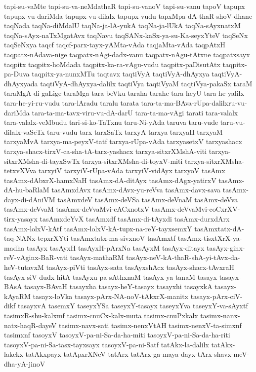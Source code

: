 {tapi-su-vaMte
tapi-su-va-neMdathaR
tapi-su-vanoV
tapi-su-vanu
tapoV
tapupx
tapupx-vu-dariMda
tapupx-vu-dilalx
tapupx-vudu
tapxMpa-dA-thaR-shoV-dhane
taqNada
taqNa-diMdalU
taqNa-ja-lA-yukA
taqNa-ja-lUkA
taqNa-sAyxnatxM
taqNa-sAyx-naTxMgatAvx
taqNavu
taqSANx-kaSx-ya-su-Ka-seyxYteV
taqSeNx
taqSeNxya
taqcf
taqcf-parx-tayx-yAMta-vAda
taqjaMta-vAda
taqpAtxH
taqpatx-nAdava-nige
taqpatx-nAgi-dadx-vanu
taqpatx-nAgu-tAtxne
taqpatxsayx
taqpitx
taqpitx-hoMdada
taqpitx-ka-ra-vAgu-vudu
taqpitx-paDisutAtx
taqpitx-pa-Duva
taqpitx-ya-nunxMTu
taqtavx
taqtiVyA
taqtiVyA-dhAyxya
taqtiVyA-dhAyxyada
taqtiVyA-dhAyxya-dalilx
taqtiVya
taqtiVyaM
taqtiVya-pakaSx
taraM
taraMgA-di-gaLige
taraMga
tara-beVku
taraha
tarahe
tara-heyU
tara-he-yalilx
tara-he-yi-ru-vudu
tara-lAradu
taralu
tarata
tara-ta-ma-BAva-rUpa-dalilxru-vu-dariMda
tara-ta-ma-tavx-viru-vu-dA-darU
tara-ta-ma-vAgi
tarati
tara-valalx
tara-valalx-veMbudu
tari-si-ko-TaTxnu
taru-Ni-yAda
taruva
taru-vude
taru-vu-dilalx-vaSeTx
taru-vudu
tarx
tarxSaTx
tarxyA
tarxya
tarxyaH
tarxyaM
tarxyaMvA
tarxya-ma-peyxV-tatf
tarxya-rUpa-vAda
tarxyasetxV
tarxyashacx
tarxya-shacx-tirxV-ca-sha-tA-tarx-yashacx
tarxya-sitxrXMshA-viti
tarxya-sitxrXMsha-di-tayxSwTx
tarxya-sitxrXMsha-di-toyxV-miti
tarxya-sitxrXMsha-tetxvXVva
tarxyiV
tarxyiV-rUpa-vAda
tarxyiV-vidAyx
tarxyoV
tasAmx
tasAmx-dAbxrX-hamxNaH
tasAmx-dA-ditAyx
tasAmx-dAgx-yatirxV
tasAmx-dA-hu-baRlaM
tasAmxdAvx
tasAmx-dAvx-yu-reVva
tasAmx-davx-sava
tasAmx-dayx-di-dAniVM
tasAmxdeV
tasAmx-deVSa
tasAmx-deVnaM
tasAmx-deVva
tasAmx-deVvaM
tasAmx-deVvaMvi-cACxnotxV
tasAmx-deVvaMvi-coCxrXV-tirx-yasayx
tasAmxdeYvX
tasAmxdf
tasAmx-di-tAyxdi
tasAmx-durxdArx
tasAmx-lolxV-kAtf
tasAmx-lolxV-kA-tupx-na-reY-tayxsemxY
tasAmxtatx-dA-taq-NANx-tepxrXYti
tasAmxtatx-ma-sivxnoV
tasAmxtf
tasAmx-tisxtXrX-ya-madha
tasAyx
tasAyxH
tasAyxH-pArxNa
tasAyxM
tasAyx-ditayx
tasAyx-ginx-reV-vAginx-BaR-vati
tasAyx-mathaRM
tasAyx-neV-kA-thaR-shA-yi-tAvx-da-heV-tutavxM
tasAyx-piVti
tasAyx-sata
tasAyxshAcx
tasAyx-shacx-tAvxraH
tasAyx-siV-dudx-hitA
tasAyxu-pa-sAthxnaM
tasAyx-ya-tanaM
tasayx
tasayx-BAsA
tasayx-BAvaH
tasayxha
tasayx-heY-tasayx
tasayxhi
tasayxkA
tasayx-kAyaRM
tasayx-loVka
tasayx-pArx-NA-noV-tAkxrX-manitx
tasayx-pArx-ciV-dikf
tasayxvA
tasemxY
taseyxYSa
taseyxY-tasayx
taseyxYva
taseyxY-va-sAyxtf
tasimxR-shu-kalxmf
tasimx-cnuCx-kalx-muta
tasimx-cnuPxkalx
tasimx-nanx-natx-haqR-dayeV
tasimx-navx-sati
tasimx-nenxVtAH
tasimx-nenxV-ta-simxnf
tasimxnf
tasoyxV
tasoyxV-pa-ni-Sa-da-ha-miti
tasoyxV-pa-ni-Sa-da-ha-riti
tasoyxV-pa-ni-Sa-tasx-tayxsayx
tasoyxV-pa-ni-Satf
tatAkx-la-dalilx
tatAkx-lakekx
tatAkxpayx
tatApxrXNeV
tatArx
tatArx-ga-maya-dayx-tArx-shavx-meV-dha-yA-jinoV
}
